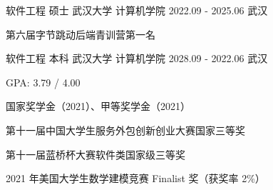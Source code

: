 

\begin{cventries}

  \cventry
    {软件工程 \quad 硕士} %
    {武汉大学 \quad 计算机学院} %
    {2022.09 - 2025.06} %
    {武汉} %
    {
      \begin{cvitems} %
        \item {第六届字节跳动后端青训营第一名}
      \end{cvitems}
    }

  \cventry
    {软件工程 \quad 本科} %
    {武汉大学 \quad 计算机学院} %
    {2028.09 - 2022.06} %
    {武汉} %
    {
      \begin{cvitems} %
        \item {GPA: 3.79 / 4.00}
        \item {国家奖学金（2021）、甲等奖学金（2021）}
        \item {第十一届中国大学生服务外包创新创业大赛国家三等奖}
        \item {第十一届蓝桥杯大赛软件类国家级三等奖}
        \item {2021 年美国大学生数学建模竞赛 Finalist 奖（获奖率 2\%）}
      \end{cvitems}
    }

\end{cventries}
